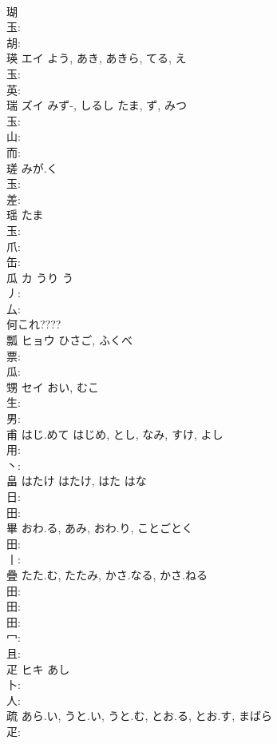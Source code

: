 \documentclass[8pt]{extreport}
\begin{document}
\begin{CJK}{UTF8}{min}
\\	瑚						
\\	玉: 
\\	胡: 
\\	瑛	エイ		よう, あき, あきら, てる, え	
\\	玉: 
\\	英: 
\\	瑞	ズイ	みず-, しるし	たま, ず, みつ	
\\	玉: 
\\	山: 
\\	而: 
\\	瑳		みが.く				
\\	玉: 
\\	差: 
\\	瑶		たま				
\\	玉: 
\\	爪: 
\\	缶: 
\\	瓜	カ	うり	う	
\\	丿: 
\\	厶: 
\\	何これ???? 
\\	瓢	ヒョウ	ひさご, ふくべ		
\\	票: 
\\	瓜: 
\\	甥	セイ	おい, むこ		
\\	生: 
\\	男: 
\\	甫		はじ.めて	はじめ, とし, なみ, すけ, よし			
\\	用: 
\\	丶: 
\\	畠	はたけ	はたけ, はた	はな	
\\	日: 
\\	田: 
\\	畢		おわ.る, あみ, おわ.り, ことごとく				
\\	田: 
\\	丨: 
\\	疊		たた.む, たたみ, かさ.なる, かさ.ねる				
\\	田: 
\\	田: 
\\	田: 
\\	冖: 
\\	且: 
\\	疋	ヒキ	あし		
\\	卜: 
\\	人: 
\\	疏		あら.い, うと.い, うと.む, とお.る, とお.す, まばら				
\\	疋: 

\end{CJK}
\end{document}
